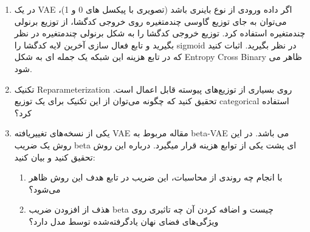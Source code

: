 \begin{enumerate}[label=(\alph*)]
	\item

در یک VAE اگر داده ورودی از نوع باینری باشد (تصویری با پیکسل های 0 و 1)، می‌توان به جای توزیع گاوسی چندمتغیره روی خروجی کدگشا، از توزیع برنولی چندمتغیره استفاده کرد. توزیع خروجی کدگشا را به شکل برنولی چندمتغیره در نظر بگیرید و تابع فعال سازی آخرین لایه کدگشا را sigmoid در نظر بگیرید. اثبات کنید که در تابع هزینه این شبکه یک جمله ای به شکل Entropy Cross Binary ظاهر می شود.

	\item
	تکنیک Reparameterization روی بسیاری از توزیع‌های پیوسته قابل اعمال است. تحقیق کنید که چگونه می‌توان از این تکنیک برای یک توزیع categorical استفاده کرد؟
	
	\item
	یکی از نسخه‌های تغییریافته VAE مقاله مربوط به beta-VAE می باشد.  در این روش یک ضریب beta ای پشت یکی از توابع هزینه قرار میگیرد. درباره این روش تحقیق کنید و بیان کنید:
	
	\begin{enumerate}[label=\arabic*)]
		\item
		با انجام چه روندی از محاسبات،‌ این ضریب در تابع هدف این روش ظاهر می‌شود؟
		\item
		هذف از افزودن ضریب beta چیست و اضافه کردن آن چه تاثیری روی ویژگی‌های فضای نهان یادگرفته‌شده توسط مدل دارد؟
	\end{enumerate}
	
\end{enumerate}